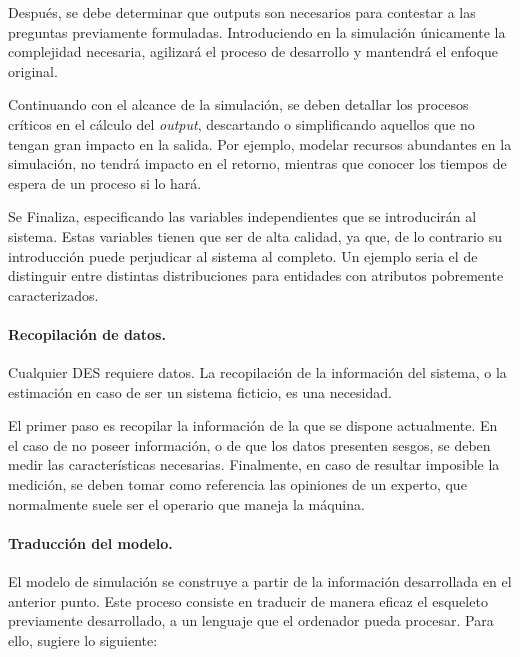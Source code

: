 Después, se debe determinar que outputs son necesarios
para contestar a las preguntas previamente formuladas.
Introduciendo en la simulación únicamente la complejidad necesaria,
agilizará el proceso de desarrollo y mantendrá el enfoque original.

Continuando con el alcance de la simulación,
se deben detallar los procesos críticos en el cálculo del \textit{output},
descartando o simplificando aquellos que no tengan gran impacto en la salida.
Por ejemplo, modelar recursos abundantes en la simulación,
no tendrá impacto en el retorno,
mientras que conocer los tiempos de espera de un proceso si lo hará.

Se Finaliza, especificando las variables independientes
que se introducirán al sistema.
Estas variables tienen que ser de alta calidad, ya que,
de lo contrario su introducción puede perjudicar al sistema al completo.
Un ejemplo seria el de distinguir entre distintas distribuciones
para entidades con atributos pobremente caracterizados.

\paragraph{Recopilación de datos.}

Cualquier DES requiere datos. La recopilación de la información del sistema,
o la estimación en caso de ser un sistema ficticio, es una necesidad.

El primer paso es recopilar la información de la que se dispone actualmente.
En el caso de no poseer información, o de que los datos presenten sesgos,
se deben medir las características necesarias.
Finalmente, en caso de resultar imposible la medición,
se deben tomar como referencia las opiniones de un experto,
que normalmente suele ser el operario que maneja la máquina.

\paragraph{Traducción del modelo.}

El modelo de simulación se construye a partir de la información desarrollada en el anterior punto.
Este proceso consiste en traducir de manera eficaz el esqueleto previamente desarrollado,
a un lenguaje que el ordenador pueda procesar.
Para ello, \citet{banks1998handbook} sugiere lo siguiente:

